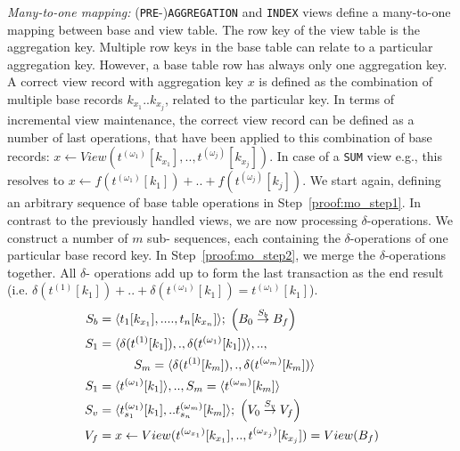 \noindent
\textit{Many-to-one mapping:} (\texttt{PRE}-)\texttt{AGGREGATION} and 
\texttt{INDEX} views define a many-to-one mapping between base and view 
table. The row key of the view table is the aggregation key. Multiple 
row keys in the base table can relate to a particular aggregation key. 
However, a base table row has always only one aggregation key. A correct 
view record with aggregation key $x$ is defined as the combination of 
multiple base records $k_{x_1}..k_{x_j}$, related to the particular key. 
In terms of incremental view maintenance, the correct view record can be 
defined as a number of last operations, that have been applied to this 
combination of base records: $x \leftarrow 
View(t^{(\omega_1)}[k_{x_1}],..,t^{(\omega_j)}[k_{x_j}])$. In case of a 
\texttt{SUM} view e.g., this resolves to $x \leftarrow 
f(t^{(\omega_1)}[k_1])+..+f(t^{(\omega_j)}[k_j])$. We start again, 
defining an arbitrary sequence of base table operations in 
Step~\ref{proof:mo_step1}. In contrast to the previously handled views, 
we are now processing $\delta$-operations. We construct a number of $m$ 
sub- sequences, each containing the $\delta$-operations of one 
particular base record key. In Step~\ref{proof:mo_step2}, we merge the 
$\delta$-operations together. All $\delta$- operations add up to form 
the last transaction as the end result (i.e. $\delta(t^{(1)}[k_{1}])+
..+\delta(t^{( \omega_1)}[k_{1}])=t^{(\omega_1)}[k_{1}]$). 
%
\begin{subequations}
  \begin{align}
  S_b&=\langle t_1[k_{x_1}],....,t_n[k_{x_n}] \rangle;\;\Big(B_0 \overset{S_b}{\rightarrow}B_f\Big) \label{proof:mo_step1}\\ 
 S_1&=\langle \delta(t^{(1)}[k_{1}]),.,\delta(t^{(\omega_1)}[k_{1}])\rangle,..,\label{proof:mo_step2}\\
 &\hspace{10 mm}S_m=\langle \delta(t^{(1)}[k_{m}]),.,\delta(t^{(\omega_m)}[k_{m}])\rangle\notag\\
  S_1&=\langle t^{(\omega_1)}[k_{1}]\rangle,..,S_m=\langle t^{(\omega_m)}[k_{m}]\rangle\\
 S_v&=\langle t_{s_1}^{(\omega_1)}[k_{1}],..t_{s_n}^{(\omega_m)}[k_{m}]\rangle;\;\Big(V_0\overset{S_v}{\rightarrow}V_f\Big)\label{proof:mo_step4}\\
 	V_f&=x\leftarrow View(t^{(\omega_{x_1})}[k_{x_1}],.., t^{(\omega_{x_j})}[k_{x_j}])=View(B_f)\label{proof:mo_step5}
  \end{align}
\end{subequations}
